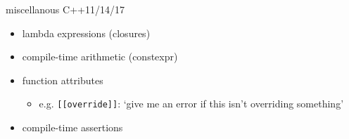 \begin{frame}{miscellanous C++11/14/17}
\begin{itemize}
\item lambda expressions (closures)
\item compile-time arithmetic (constexpr)
\item function attributes
    \begin{itemize}
    \item e.g. \texttt{[[override]]}: `give me an error if this isn't overriding something'
    \end{itemize}
\item compile-time assertions
\end{itemize}
\end{frame}
